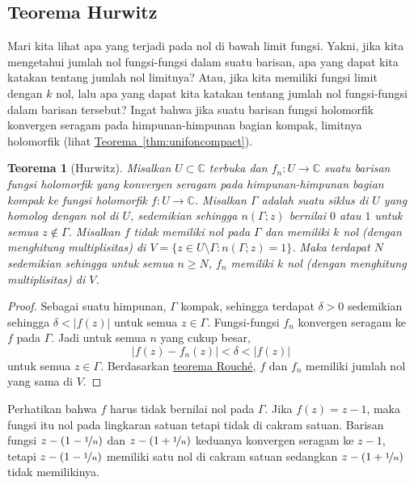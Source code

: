 \documentclass[12pt,openany]{book}
\newcommand{\sabs}[1]{\lvert {#1} \rvert}
\newcommand{\C}{{\mathbb{C}}}
\theoremstyle{plain}
\newtheorem{thm}{Teorema}[section]
\theoremstyle{remark}
\theoremstyle{definition}
\theoremstyle{exercise}
\theoremstyle{example}
\newcommand{\thmref}[1]{\hyperref[#1]{Teorema~\ref*{#1}}}
\begin{document}
\subsection{Teorema Hurwitz}

Mari kita lihat apa yang terjadi pada nol di bawah limit fungsi.
Yakni, jika kita mengetahui jumlah nol fungsi-fungsi dalam suatu barisan,
apa yang dapat kita katakan tentang jumlah nol limitnya?  Atau,
jika kita memiliki fungsi limit dengan $k$ nol, lalu apa yang dapat
kita katakan tentang jumlah nol fungsi-fungsi dalam barisan tersebut?
Ingat bahwa jika suatu barisan fungsi holomorfik
konvergen seragam pada himpunan-himpunan bagian kompak, limitnya holomorfik
(lihat \thmref{thm:unifoncompact}).

\begin{thm}[Hurwitz]
Misalkan $U \subset \C$ terbuka dan $f_n \colon U \to \C$ suatu barisan
fungsi holomorfik yang konvergen seragam pada himpunan-himpunan bagian kompak
ke fungsi holomorfik $f \colon U \to \C$.  Misalkan $\Gamma$ adalah
suatu siklus di $U$ yang homolog dengan nol di $U$,
sedemikian sehingga $n(\Gamma;z)$ bernilai $0$ atau $1$ untuk semua $z \notin \Gamma$.
Misalkan $f$ tidak memiliki nol pada $\Gamma$ dan memiliki $k$ nol (dengan menghitung
multiplisitas) di $V = \bigl\{ z \in U \setminus \Gamma : n(\Gamma;z) = 1 \bigr\}$.
Maka terdapat $N$ sedemikian sehingga untuk semua $n \geq N$,
$f_n$ memiliki $k$ nol (dengan menghitung multiplisitas) di $V$.
\end{thm}

\begin{proof}
Sebagai suatu himpunan, $\Gamma$ kompak, sehingga
terdapat $\delta > 0$ sedemikian sehingga $\delta < \sabs{f(z)}$
untuk semua $z \in \Gamma$.
Fungsi-fungsi $f_n$
konvergen seragam ke $f$ pada $\Gamma$.
Jadi untuk semua $n$ yang cukup besar,
\begin{equation*}
\sabs{f(z)-f_n(z)} < \delta < \sabs{f(z)}
\end{equation*}
untuk semua $z \in \Gamma$.  Berdasarkan \hyperref[thm:rouche2]{teorema Rouch\'e},
$f$ dan $f_n$ memiliki jumlah nol yang sama di $V$.
\end{proof}

Perhatikan bahwa $f$ harus
tidak bernilai nol pada $\Gamma$.  Jika $f(z) = z-1$, maka fungsi itu nol pada
lingkaran satuan tetapi tidak di cakram satuan.
Barisan fungsi $z-(1-\nicefrac{1}{n})$ dan 
$z-(1+\nicefrac{1}{n})$ keduanya konvergen seragam ke $z-1$, tetapi
$z-(1-\nicefrac{1}{n})$ memiliki satu nol di cakram satuan
sedangkan $z-(1+\nicefrac{1}{n})$ tidak memilikinya.
\end{document}
